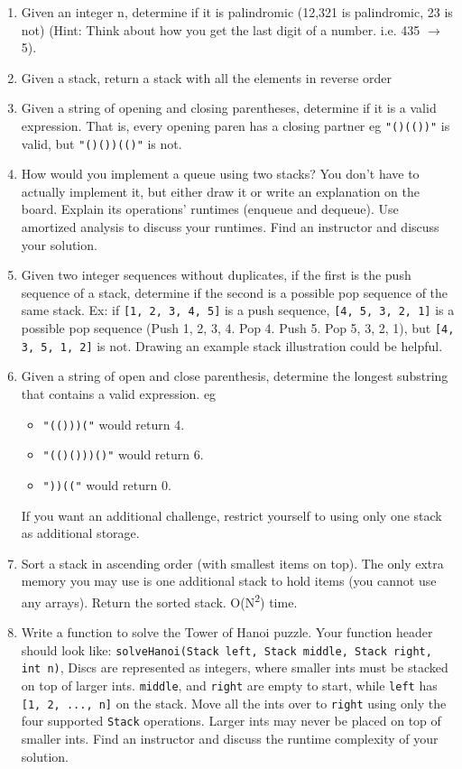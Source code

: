 \documentclass{article}
\begin{document}
\begin{enumerate}
    
\item Given an integer n, determine if it is palindromic (12,321 is palindromic, 23 is not) (Hint: Think about how you get the last digit of a number. i.e. 435 $\rightarrow$ 5).

\item Given a stack, return a stack with all the elements in reverse order

\item Given a string of opening and closing parentheses, determine if it is a valid expression. That is, every opening paren has a closing partner eg \texttt{"()(())"} is valid, but \texttt{"()())(()"} is not.

\item How would you implement a queue using two stacks? You don’t have to actually implement it, but either draw it or write an explanation on the board. Explain its operations’ runtimes (enqueue and dequeue). Use amortized analysis to discuss your runtimes. Find an instructor and discuss your solution.

\item Given two integer sequences without duplicates, if the first is the push sequence of a stack, determine if the second is a possible pop sequence of the same stack. Ex: if \texttt{[1, 2, 3, 4, 5]} is a push sequence, \texttt{[4, 5, 3, 2, 1]} is a possible pop sequence (Push 1, 2, 3, 4. Pop 4. Push 5. Pop 5, 3, 2, 1), but \texttt{[4, 3, 5, 1, 2]} is not. Drawing an example stack illustration could be helpful.

\item Given a string of open and close parenthesis, determine the longest substring that contains a valid expression. eg
\begin{itemize}
  \item \texttt{"(()))("} would return 4.
  \item \texttt{"(()()))()"} would return 6.
  \item \texttt{"))(("} would return 0. 
\end{itemize}
If you want an additional challenge, restrict yourself to using only one stack as additional storage.

\item Sort a stack in ascending order (with smallest items on top). The only extra memory you may use is one additional stack to hold items (you cannot use any arrays). Return the sorted stack. O(N\textsuperscript{2}) time.

\item Write a function to solve the Tower of Hanoi puzzle. Your function header should look like: \texttt{solveHanoi(Stack left, Stack middle, Stack right, int n)}, Discs are represented as integers, where smaller ints must be stacked on top of larger ints. \texttt{middle}, and \texttt{right} are empty to start, while \texttt{left} has \texttt{[1, 2, ..., n]} on the stack. Move all the ints over to \texttt{right} using only the four supported \texttt{Stack} operations. Larger ints may never be placed on top of smaller ints. Find an instructor and discuss the runtime complexity of your solution.
\end{enumerate}
\end{document}
